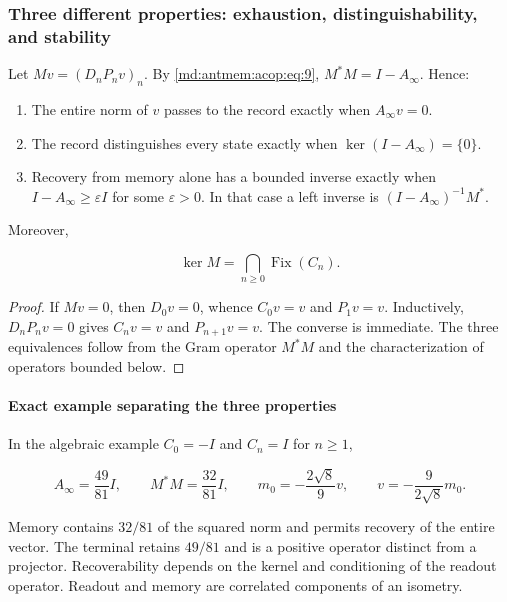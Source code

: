 \subsubsection{Three different properties: exhaustion, distinguishability, and stability}

Let \(Mv=(D_nP_nv)_n\). By \eqref{md:antmem:acop:eq:9}, \(M^*M=I-A_\infty\). Hence:

\begin{enumerate}
\item The entire norm of \(v\) passes to the record exactly when \(A_\infty v=0\).
\item The record distinguishes every state exactly when \(\ker(I-A_\infty)=\{0\}\).
\item Recovery from memory alone has a bounded inverse exactly when
\(I-A_\infty\geq\varepsilon I\) for some \(\varepsilon>0\).
In that case a left inverse is \((I-A_\infty)^{-1}M^*\).
\end{enumerate}

Moreover,

\begin{equation}
\boxed{\ker M=\bigcap_{n\ge0}\operatorname{Fix}(C_n).}
\label{md:antmem:acop:eq:12}
\end{equation}

\begin{proof}
If \(Mv=0\), then \(D_0v=0\), whence \(C_0v=v\)
and \(P_1v=v\). Inductively, \(D_nP_nv=0\) gives \(C_nv=v\) and
\(P_{n+1}v=v\). The converse is immediate. The three equivalences
follow from the Gram operator \(M^*M\) and the characterization of
operators bounded below.
\end{proof}

\paragraph{Exact example separating the three properties}

In the algebraic example \(C_0=-I\) and \(C_n=I\) for \(n\geq1\),

\begin{equation}
A_\infty=\frac{49}{81}I,\qquad M^*M=\frac{32}{81}I,
\qquad m_0=-\frac{2\sqrt8}{9}v,
\qquad v=-\frac9{2\sqrt8}m_0.
\label{md:antmem:acop:eq:13}
\end{equation}

Memory contains \(32/81\) of the squared norm and permits recovery of the entire vector. The terminal retains \(49/81\) and is a positive operator distinct from a projector. Recoverability depends on the kernel and conditioning of the readout operator. Readout and memory are correlated components of an isometry.

